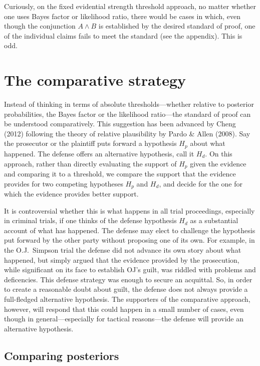 \documentclass[
  10pt,
  dvipsnames,enabledeprecatedfontcommands]{scrartcl}
\newcommand{\et}{\wedge}
\begin{document}
Curiously, on the fixed evidential strength threshold approach, no
matter whether one uses Bayes factor or likelihood ratio, there would be
cases in which, even though the conjunction \(A\et B\) is established by
the desired standard of proof, one of the individual claims fails to
meet the standard (see the appendix). This is odd.

\hypertarget{the-comparative-strategy}{%
\section{The comparative strategy}\label{the-comparative-strategy}}

Instead of thinking in terms of absolute thresholds---whether relative
to posterior probabilities, the Bayes factor or the likelihood
ratio---the standard of proof can be understood comparatively. This
suggestion has been advanced by Cheng (2012) following the theory of
relative plausibility by Pardo \& Allen (2008). Say the prosecutor or
the plaintiff puts forward a hypothesis \(H_p\) about what happened. The
defense offers an alternative hypothesis, call it \(H_d\). On this
approach, rather than directly evaluating the support of \(H_p\) given
the evidence and comparing it to a threshold, we compare the support
that the evidence provides for two competing hypotheses \(H_p\) and
\(H_d\), and decide for the one for which the evidence provides better
support.

It is controversial whether this is what happens in all trial
proceedings, especially in criminal trials, if one thinks of the defense
hypothesis \(H_d\) as a substantial account of what has happened. The
defense may elect to challenge the hypothesis put forward by the other
party without proposing one of its own. For example, in the O.J.~Simpson
trial the defense did not advance its own story about what happened, but
simply argued that the evidence provided by the prosecution, while
significant on its face to establish OJ's guilt, was riddled with
problems and deficencies. This defense strategy was enough to secure an
acquittal. So, in order to create a reasonable doubt about guilt, the
defense does not always provide a full-fledged alternative hypothesis.
The supporters of the comparative approach, however, will respond that
this could happen in a small number of cases, even though in
general---especially for tactical reasons---the defense will provide an
alternative hypothesis.

\hypertarget{comparing-posteriors}{%
\subsection{Comparing posteriors}\label{comparing-posteriors}}
\end{document}
